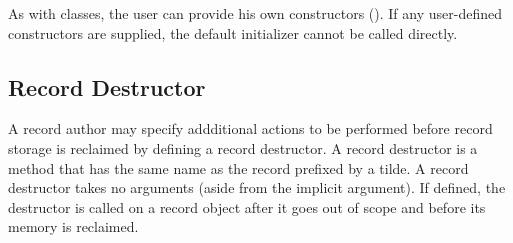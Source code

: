 As with classes, the user can provide his own constructors
().  If any user-defined constructors are
supplied, the default initializer cannot be called directly.  

\subsection{Record Destructor}
\label{Record_Destructor}

A record author may specify addditional actions to be performed before record storage is
reclaimed by defining a record destructor.  A record destructor is a method that has the
same name as the record prefixed by a tilde.  A record destructor takes no arguments
(aside from the implicit  argument).  If defined, the destructor is called
on a record object after it goes out of scope and before its memory is reclaimed.




